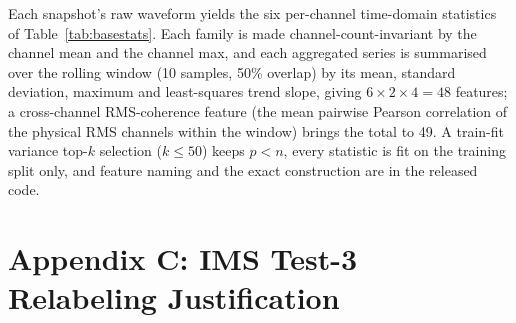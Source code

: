 \documentclass[IJPHM, 2026, 0]{PHMSociety}
\begin{document}
Each snapshot's raw waveform yields the six per-channel time-domain statistics of Table~\ref{tab:basestats}. Each family is made channel-count-invariant by the channel mean and the channel max, and each aggregated series is summarised over the rolling window (10 samples, 50\% overlap) by its mean, standard deviation, maximum and least-squares trend slope, giving $6 \times 2 \times 4 = 48$ features; a cross-channel RMS-coherence feature (the mean pairwise Pearson correlation of the physical RMS channels within the window) brings the total to 49. A train-fit variance top-$k$ selection ($k \le 50$) keeps $p < n$, every statistic is fit on the training split only, and feature naming and the exact construction are in the released code.



\section*{Appendix C: IMS Test-3 Relabeling Justification}
\end{document}
